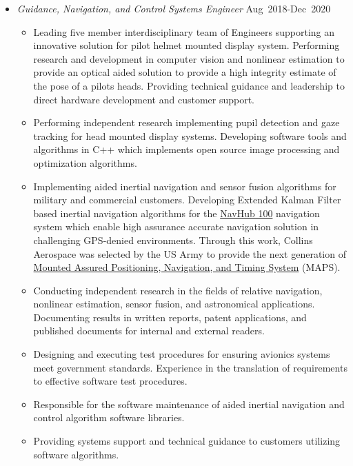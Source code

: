 \begin{itemize}
    \item[] \textit{Guidance, Navigation, and Control Systems Engineer}
                    \hfill {Aug~2018-Dec~2020} 
        \begin{itemize}
            \item Leading five member interdisciplinary team of Engineers supporting an innovative solution for pilot helmet mounted display system. 
                Performing research and development in computer vision and nonlinear estimation to provide an optical aided solution to provide a high integrity estimate of the pose of a pilots heads. 
                Providing technical guidance and leadership to direct hardware development and customer support.
            \item Performing independent research implementing pupil detection and gaze tracking for head mounted display systems. 
                Developing software tools and algorithms in C++ which implements open source image processing and optimization algorithms.
            \item Implementing aided inertial navigation and sensor fusion algorithms for military and commercial customers. 
                Developing Extended Kalman Filter based inertial navigation algorithms for the \href{https://www.collinsaerospace.com/what-we-do/Military-And-Defense/Navigation/Ground-Products/NavHub-100-navigation-system}{NavHub 100} navigation system which enable high assurance accurate navigation solution in challenging GPS-denied environments.
                Through this work, Collins Aerospace was selected by the US Army to provide the next generation of \href{https://www.collinsaerospace.com/en/newsroom/News/2019/10/collins-next-gen-nav-system-selected-us-army-enable-critical-assured-pnt-contested-enviornments}{Mounted Assured Positioning, Navigation, and Timing System} (MAPS).
            \item Conducting independent research in the fields of relative navigation, nonlinear estimation, sensor fusion, and astronomical applications.
                Documenting results in written reports, patent applications, and published documents for internal and external readers. 
            \item Designing and executing test procedures for ensuring avionics systems meet government standards.
                Experience in the translation of requirements to effective software test procedures.
            \item Responsible for the software maintenance of aided inertial navigation and control algorithm software libraries. 
            \item Providing systems support and technical guidance to customers utilizing software algorithms.
        \end{itemize}
\end{itemize}

